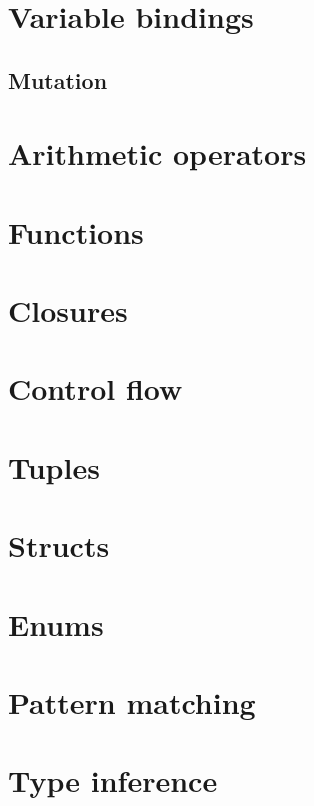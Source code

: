 \section{Variable bindings}\label{section:reference:variable_bindings}
\subsection{Mutation}\label{section:reference:variable_bindings:mutation}
\section{Arithmetic operators}\label{section:reference:operators}
\section{Functions}\label{section:reference:functions}
\section{Closures}\label{section:reference:closures}
\section{Control flow}\label{section:reference:control_flow}
\section{Tuples}\label{section:reference:tuples}
\section{Structs}\label{section:reference:structs}
\section{Enums}\label{section:reference:enums}
\section{Pattern matching}\label{section:reference:pattern_matching}
\section{Type inference}\label{section:reference:type_inference}

